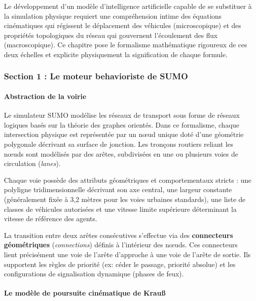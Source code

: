 \documentclass[10pt, a4paper]{article}
\begin{document}
Le développement d'un modèle d'intelligence artificielle capable de se
substituer à la simulation physique requiert une compréhension intime
des équations cinématiques qui régissent le déplacement des véhicules
(microscopique) et des propriétés topologiques du réseau qui gouvernent
l'écoulement des flux (macroscopique). Ce chapitre pose le formalisme
mathématique rigoureux de ces deux échelles et explicite physiquement la
signification de chaque formule.

\subsubsection{Section 1 : Le moteur behavioriste de
SUMO}\label{section-1-le-moteur-behavioriste-de-sumo}

\paragraph{Abstraction de la voirie}\label{abstraction-de-la-voirie}

Le simulateur SUMO modélise les réseaux de transport sous forme de
réseaux logiques basés sur la théorie des graphes orientés. Dans ce
formalisme, chaque intersection physique est représentée par un nœud
unique doté d'une géométrie polygonale décrivant sa surface de jonction.
Les tronçons routiers reliant les nœuds sont modélisés par des arêtes,
subdivisées en une ou plusieurs voies de circulation (\emph{lanes}).

Chaque voie possède des attributs géométriques et comportementaux
stricts : une polyligne tridimensionnelle décrivant son axe central, une
largeur constante (généralement fixée à 3,2 mètres pour les voies
urbaines standards), une liste de classes de véhicules autorisées et une
vitesse limite supérieure déterminant la vitesse de référence des
agents.

La transition entre deux arêtes consécutives s'effectue via des
\textbf{connecteurs géométriques} (\emph{connections}) définis à
l'intérieur des nœuds. Ces connecteurs lient précisément une voie de
l'arête d'approche à une voie de l'arête de sortie. Ils supportent les
règles de priorité (ex: céder le passage, priorité absolue) et les
configurations de signalisation dynamique (phases de feux).

\paragraph{Le modèle de poursuite cinématique de
Krauß}\label{le-moduxe8le-de-poursuite-cinuxe9matique-de-krauuxdf}
\end{document}
